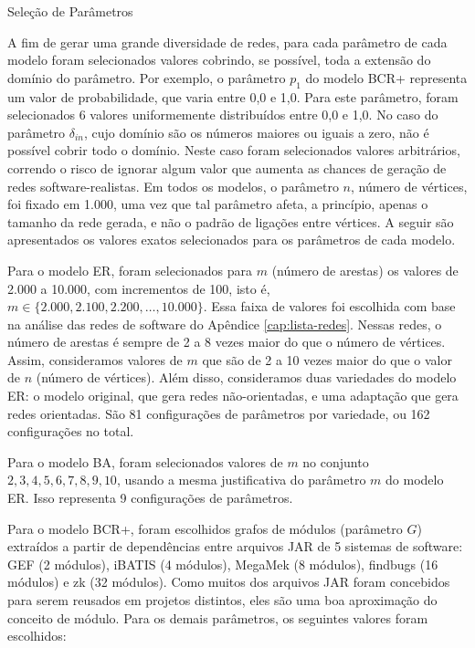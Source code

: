 \begin{section}{Seleção de Parâmetros} \label{sec:parametros}
	
	A fim de gerar uma grande diversidade de redes, para cada parâmetro de cada modelo foram selecionados valores cobrindo, se possível, toda a extensão do domínio do parâmetro. Por exemplo, o parâmetro $p_1$ do modelo BCR+ representa um valor de probabilidade, que varia entre 0,0 e 1,0. Para este parâmetro, foram selecionados 6 valores uniformemente distribuídos entre 0,0 e 1,0. No caso do parâmetro $\delta_{in}$, cujo domínio são os números maiores ou iguais a zero, não é possível cobrir todo o domínio. Neste caso foram selecionados valores arbitrários, correndo o risco de ignorar algum valor que aumenta as chances de geração de redes software-realistas. Em todos os modelos, o parâmetro $n$, número de vértices, foi fixado em 1.000, uma vez que tal parâmetro afeta, a princípio, apenas o tamanho da rede gerada, e não o padrão de ligações entre vértices. A seguir são apresentados os valores exatos selecionados para os parâmetros de cada modelo.

Para o modelo ER, foram selecionados para $m$ (número de arestas) os valores de 2.000 a 10.000, com incrementos de 100, isto é, $m \in \{2.000, 2.100, 2.200, \ldots, 10.000\}$. Essa faixa de valores foi escolhida com base na análise das redes de software do Apêndice \ref{cap:lista-redes}. Nessas redes, o número de arestas é sempre de 2 a 8 vezes maior do que o número de vértices. Assim, consideramos valores de $m$ que são de 2 a 10 vezes maior do que o valor de $n$ (número de vértices). Além disso, consideramos duas variedades do modelo ER: o modelo original, que gera redes não-orientadas, e uma adaptação que gera redes orientadas. São 81 configurações de parâmetros por variedade, ou 162 configurações no total.

Para o modelo BA, foram selecionados valores de $m$ no conjunto ${2, 3, 4, 5, 6, 7, 8, 9, 10}$, usando a mesma justificativa do parâmetro $m$ do modelo ER. Isso representa 9 configurações de parâmetros.

Para o modelo BCR+, foram escolhidos grafos de módulos (parâmetro $G$) extraídos a partir de dependências entre arquivos JAR de 5 sistemas de software: GEF (2 módulos), iBATIS (4 módulos), MegaMek (8 módulos), findbugs (16 módulos) e zk (32 módulos). Como muitos dos arquivos JAR foram concebidos para serem reusados em projetos distintos, eles são uma boa aproximação do conceito de módulo. Para os demais parâmetros, os seguintes valores foram escolhidos:


\end{section}

